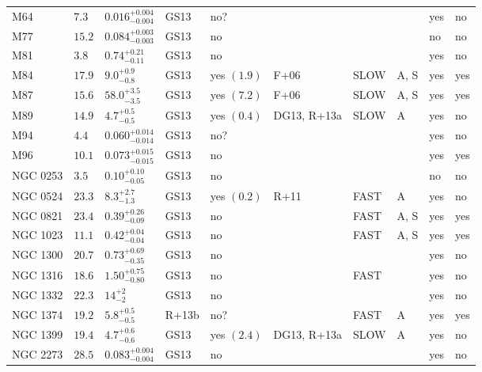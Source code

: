\begin{table*}
\begin{center}
\begin{tabular}{llllllllll}
M64  &  $7.3$  &  $0.016_{-0.004}^{+0.004}$   &  GS13  &  no?  &     &      &     &  yes  &  no  \\ 
M77  &  $15.2$  &  $0.084_{-0.003}^{+0.003}$   &  GS13  &  no   &     &      &     &  no  &  no  \\ 
M81  &  $3.8$  &  $0.74_{-0.11}^{+0.21}$   &  GS13  &  no   &     &      &     &  yes  &  no  \\ 
M84  &  $17.9$  &  $9.0_{-0.8}^{+0.9}$   &  GS13  &  yes  $(1.9)$  &  F+06  &   SLOW  &  A, S  &  yes  &  yes  \\ 
M87  &  $15.6$  &  $58.0_{-3.5}^{+3.5}$   &  GS13  &  yes  $(7.2)$  &  F+06  &   SLOW  &  A, S  &  yes  &  yes  \\ 
M89  &  $14.9$  &  $4.7_{-0.5}^{+0.5}$   &  GS13  &  yes  $(0.4)$  &  DG13, R+13a  &   SLOW  &  A  &  yes  &  no  \\ 
M94  &  $4.4$  &  $0.060_{-0.014}^{+0.014}$   &  GS13  &  no?  &     &      &     &  yes  &  no  \\ 
M96  &  $10.1$  &  $0.073_{-0.015}^{+0.015}$   &  GS13  &  no   &     &      &     &  yes  &  yes  \\ 
NGC 0253  &  $3.5$  &  $0.10_{-0.05}^{+0.10}$   &  GS13  &  no   &     &      &     &  no  &  no  \\ 
NGC 0524  &  $23.3$  &  $8.3_{-1.3}^{+2.7}$   &  GS13  &  yes  $(0.2)$  &  R+11  &  FAST   &  A  &  yes  &  no  \\ 
NGC 0821  &  $23.4$  &  $0.39_{-0.09}^{+0.26}$   &  GS13  &  no   &     &  FAST   &  A, S  &  yes  &  yes  \\ 
NGC 1023  &  $11.1$  &  $0.42_{-0.04}^{+0.04}$   &  GS13  &  no   &     &  FAST   &  A, S  &  yes  &  yes  \\ 
NGC 1300  &  $20.7$  &  $0.73_{-0.35}^{+0.69}$   &  GS13  &  no   &     &      &     &  yes  &  no  \\ 
NGC 1316  &  $18.6$  &  $1.50_{-0.80}^{+0.75}$   &  GS13  &  no   &     &  FAST   &     &  yes  &  no  \\ 
NGC 1332  &  $22.3$  &  $14_{-2}^{+2}$   &  GS13  &  no   &     &      &     &  yes  &  no  \\ 
NGC 1374  &  $19.2$  &  $5.8_{-0.5}^{+0.5}$   &  R+13b  &  no?  &     &  FAST   &  A  &  yes  &  yes  \\ 
NGC 1399  &  $19.4$  &  $4.7_{-0.6}^{+0.6}$   &  GS13  &  yes  $(2.4)$  &  DG13, R+13a  &   SLOW  &  A  &  yes  &  no  \\ 
NGC 2273  &  $28.5$  &  $0.083_{-0.004}^{+0.004}$   &  GS13  &  no   &     &      &     &  yes  &  no  \\ 

\end{tabular}
\end{center}
\end{table*}
